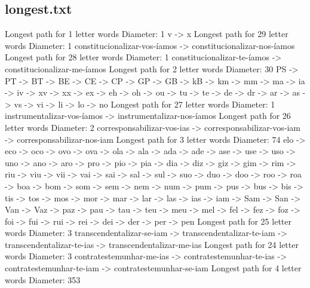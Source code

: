\documentclass[a4paper,11pt]{article}
\begin{document}
	\subsection{longest.txt}
	Longest path for 1 letter words
Diameter: 1
v -> x
Longest path for 29 letter words
Diameter: 1
constitucionalizar-vos-íamos -> constitucionalizar-nos-íamos
Longest path for 28 letter words
Diameter: 1
constitucionalizar-te-íamos -> constitucionalizar-me-íamos
Longest path for 2 letter words
Diameter: 30
PS -> PT -> BT -> BE -> CE -> CP -> GP -> GB -> kB -> km -> mm -> ma -> ia -> iv -> xv -> xx -> ex -> eh -> oh -> ou -> tu -> te -> de -> dr -> ar -> as -> vs -> vi -> li -> lo -> no
Longest path for 27 letter words
Diameter: 1
instrumentalizar-vos-íamos -> instrumentalizar-nos-íamos
Longest path for 26 letter words
Diameter: 2
corresponsabilizar-vos-ias -> corresponsabilizar-vos-iam -> corresponsabilizar-nos-iam
Longest path for 3 letter words
Diameter: 74
elo -> eco -> oco -> ovo -> ova -> ola -> ala -> ada -> ade -> ase -> use -> uso -> uno -> ano -> aro -> pro -> pio -> pia -> dia -> diz -> giz -> gim -> rim -> riu -> viu -> vii -> vai -> sai -> sal -> sul -> suo -> duo -> doo -> roo -> roa -> boa -> bom -> som -> sem -> nem -> num -> pum -> pus -> bus -> bis -> tis -> tos -> mos -> mor -> mar -> lar -> las -> ias -> iam -> Sam -> San -> Van -> Vaz -> paz -> pau -> tau -> teu -> meu -> mel -> fel -> fez -> foz -> foi -> fui -> rui -> rei -> dei -> der -> per -> pen
Longest path for 25 letter words
Diameter: 3
transcendentalizar-se-iam -> transcendentalizar-te-iam -> transcendentalizar-te-ias -> transcendentalizar-me-ias
Longest path for 24 letter words
Diameter: 3
contratestemunhar-me-ias -> contratestemunhar-te-ias -> contratestemunhar-te-iam -> contratestemunhar-se-iam
Longest path for 4 letter words
Diameter: 353
\end{document}

